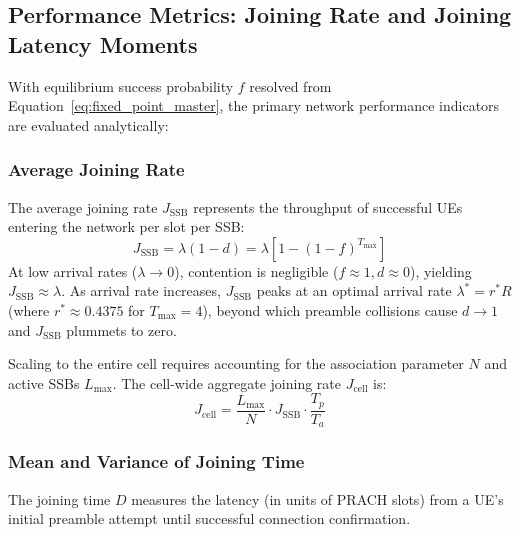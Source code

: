 \subsection{Performance Metrics: Joining Rate and Joining Latency Moments}
With equilibrium success probability $f$ resolved from Equation~\eqref{eq:fixed_point_master}, the primary network performance indicators are evaluated analytically:

\subsubsection{Average Joining Rate}
The average joining rate $J_{\mathrm{SSB}}$ represents the throughput of successful UEs entering the network per slot per SSB:
\begin{equation}
    \label{eq:joining_rate_ssb}
    J_{\mathrm{SSB}} = \lambda (1 - d) = \lambda \left[ 1 - (1 - f)^{T_{\max}} \right]
\end{equation}
At low arrival rates ($\lambda \to 0$), contention is negligible ($f \approx 1, d \approx 0$), yielding $J_{\mathrm{SSB}} \approx \lambda$. As arrival rate increases, $J_{\mathrm{SSB}}$ peaks at an optimal arrival rate $\lambda^* = r^* R$ (where $r^* \approx 0.4375$ for $T_{\max} = 4$), beyond which preamble collisions cause $d \to 1$ and $J_{\mathrm{SSB}}$ plummets to zero.

Scaling to the entire cell requires accounting for the association parameter $N$ and active SSBs $L_{\max}$. The cell-wide aggregate joining rate $J_{\mathrm{cell}}$ is:
\begin{equation}
    \label{eq:joining_rate_cell}
    J_{\mathrm{cell}} = \frac{L_{\max}}{N} \cdot J_{\mathrm{SSB}} \cdot \frac{T_p}{T_a}
\end{equation}

\subsubsection{Mean and Variance of Joining Time}
The joining time $D$ measures the latency (in units of PRACH slots) from a UE's initial preamble attempt until successful connection confirmation. 

